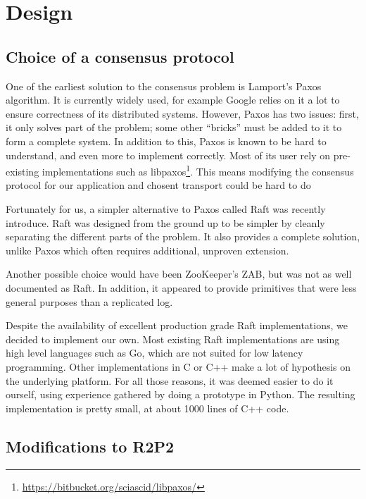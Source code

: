 \chapter{Design}
\label{chap:design}

\section{Choice of a consensus protocol}

One of the earliest solution to the consensus problem is Lamport's Paxos algorithm\cite{paxos}.
It is currently widely used, for example Google relies on it a lot to ensure correctness of its distributed systems\cite{chubby, paxoslive}.
However, Paxos has two issues: first, it only solves part of the problem; some other ``bricks'' must be added to it to form a complete system.
In addition to this, Paxos is known to be hard to understand, and even more to implement correctly.
Most of its user rely on pre-existing implementations such as libpaxos\footnote{\url{https://bitbucket.org/sciascid/libpaxos/}}.
This means modifying the consensus protocol for our application and chosent transport could be hard to do

Fortunately for us, a simpler alternative to Paxos called Raft was recently introduce\cite{raft}.
Raft was designed from the ground up to be simpler by cleanly separating the different parts of the problem.
It also provides a complete solution, unlike Paxos which often requires additional, unproven extension\cite{paxoslive}.

Another possible choice would have been ZooKeeper's ZAB\cite{zookeeper}, but was not as well documented as Raft.
In addition, it appeared to provide primitives that were less general purposes than a replicated log.

Despite the availability of excellent production grade Raft implementations, we decided to implement our own.
Most existing Raft implementations are using high level languages such as Go, which are not suited for low latency programming.
Other implementations in C or C++ make a lot of hypothesis on the underlying platform.
For all those reasons, it was deemed easier to do it ourself, using experience gathered by doing a prototype in Python.
The resulting implementation is pretty small, at about 1000 lines of C++ code.

\section{Modifications to R2P2}


